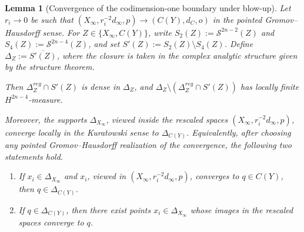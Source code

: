 \documentclass[11pt]{amsart}
\newtheorem{lemma}[theorem]{Lemma}
\theoremstyle{definition}
\theoremstyle{remark}
\begin{document}
\begin{lemma}[Convergence of the codimension-one boundary under blow-up]
\label{lem:boundary-support-convergence}
Let $r_i\to0$ be such that
$(X_\infty,r_i^{-2}d_\infty,p)\to (C(Y),d_C,o)$ in the pointed
Gromov--Hausdorff sense. For $Z\in\{X_\infty,C(Y)\}$, write
$S_2(Z):=\mathcal S^{2n-2}(Z)$ and $S_4(Z):=\mathcal S^{2n-4}(Z)$, and set
$S'(Z):=S_2(Z)\setminus S_4(Z)$. Define
$\Delta_Z:=\overline{S'(Z)}$, where the closure is taken in the complex analytic
structure given by the structure theorem.

Then $\Delta_Z^{reg}\cap S'(Z)$ is dense in $\Delta_Z$, and
$\Delta_Z\setminus(\Delta_Z^{reg}\cap S'(Z))$ has locally finite
$H^{2n-4}$-measure.

Moreover, the supports $\Delta_{X_\infty}$, viewed inside the rescaled spaces
$(X_\infty,r_i^{-2}d_\infty,p)$, converge locally in the Kuratowski sense to
$\Delta_{C(Y)}$. Equivalently, after choosing any pointed
Gromov--Hausdorff realization of the convergence, the following two statements
hold.

\begin{enumerate}
\item If $x_i\in\Delta_{X_\infty}$ and $x_i$, viewed in
$(X_\infty,r_i^{-2}d_\infty,p)$, converges to $q\in C(Y)$, then
$q\in\Delta_{C(Y)}$.

\item If $q\in\Delta_{C(Y)}$, then there exist points
$x_i\in\Delta_{X_\infty}$ whose images in the rescaled spaces converge to $q$.
\end{enumerate}
\end{lemma}
\end{document}
